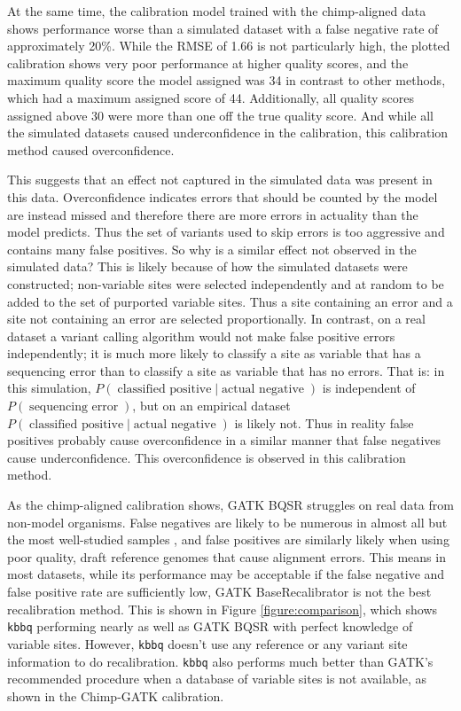 At the same time, the calibration model trained with the chimp-aligned data shows performance worse than a simulated dataset with a false negative rate of approximately 20\%. While the RMSE of 1.66 is not particularly high, the plotted calibration shows very poor performance at higher quality scores, and the maximum quality score the model assigned was 34 in contrast to other methods, which had a maximum assigned score of 44. Additionally, all quality scores assigned above 30 were more than one off the true quality score. And while all the simulated datasets caused underconfidence in the calibration, this calibration method caused overconfidence.

This suggests that an effect not captured in the simulated data was present in this data. Overconfidence indicates errors that should be counted by the model are instead missed and therefore there are more errors in actuality than the model predicts. Thus the set of variants used to skip errors is too aggressive and contains many false positives. So why is a similar effect not observed in the simulated data? This is likely because of how the simulated datasets were constructed; non-variable sites were selected independently and at random to be added to the set of purported variable sites. Thus a site containing an error and a site not containing an error are selected proportionally. In contrast, on a real dataset a variant calling algorithm would not make false positive errors independently; it is much more likely to classify a site as variable that has a sequencing error than to classify a site as variable that has no errors. That is: in this simulation, $P(\operatorname{classified\:positive} | \operatorname{actual\:negative})$ is independent of $P(\operatorname{sequencing\:error})$, but on an empirical dataset $P(\operatorname{classified\:positive} | \operatorname{actual\:negative})$ is likely not. Thus in reality false positives probably cause overconfidence in a similar manner that false negatives cause underconfidence. This overconfidence is observed in this calibration method.

As the chimp-aligned calibration shows, GATK BQSR struggles on real data from non-model organisms. False negatives are likely to be numerous in almost all but the most well-studied samples \parencite{bobo_false_2016}, and false positives are similarly likely when using poor quality, draft reference genomes that cause alignment errors. This means in most datasets, while its performance may be acceptable if the false negative and false positive rate are sufficiently low, GATK BaseRecalibrator is not the best recalibration method. This is shown in Figure \ref{figure:comparison}, which shows \texttt{kbbq} performing nearly as well as GATK BQSR with perfect knowledge of variable sites. However, \texttt{kbbq} doesn't use any reference or any variant site information to do recalibration. \texttt{kbbq} also performs much better than GATK's recommended procedure when a database of variable sites is not available, as shown in the Chimp-GATK calibration.

